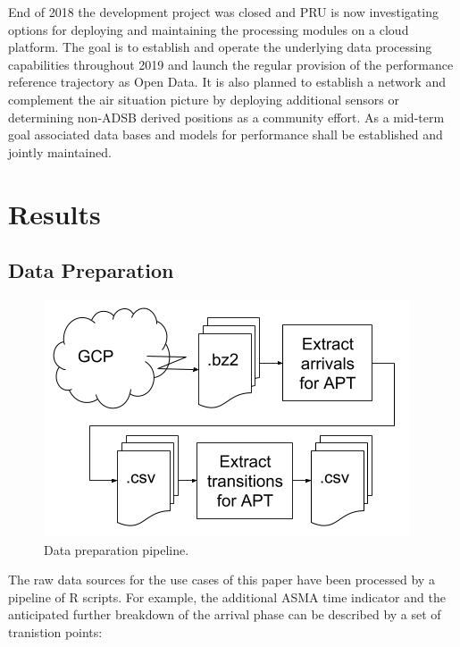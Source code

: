 \documentclass[conference,final,a4paper,]{IEEEtran}
\begin{document}
End of 2018 the development project was closed and PRU is now
investigating options for deploying and maintaining the processing
modules on a cloud platform. The goal is to establish and operate the
underlying data processing capabilities throughout 2019 and launch the
regular provision of the performance reference trajectory as Open Data.
It is also planned to establish a network and complement the air
situation picture by deploying additional sensors or determining
non-ADSB derived positions as a community effort. As a mid-term goal
associated data bases and models for performance shall be established
and jointly maintained.

\section{Results}\label{results}

\subsection{Data Preparation}\label{data-preparation}



\begin{figure}[htb]

{\centering \includegraphics[width=1\linewidth]{figures/data-preparation-pipeline} 

}

\caption{Data preparation pipeline.}\label{fig:data-preparation-pipeline}
\end{figure}

The raw data sources for the use cases of this paper have been processed
by a pipeline of R scripts. For example, the additional ASMA time
indicator and the anticipated further breakdown of the arrival phase can
be described by a set of tranistion points:
\end{document}
